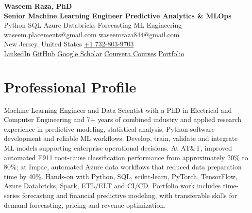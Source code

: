 \documentclass[9pt,letterpaper]{extarticle}
\begin{document}
\begin{center}
{\LARGE\bfseries Waseem Raza, PhD}{\normalsize\mdseries }\\[2pt]
{\large\bfseries Senior Machine Learning Engineer \textbar{} Predictive Analytics \& MLOps}\\[1pt]
{\small Python \textbar{} SQL \textbar{} Azure Databricks \textbar{} Forecasting \textbar{} ML Engineering}\\[3pt]
{\footnotesize {}\enspace \href{mailto:waseem.placements@gmail.com}{waseem.placements@gmail.com} \textbar{} \href{mailto:waseemraza844@gmail.com}{waseemraza844@gmail.com}\\[1pt]New Jersey, United States \quad {}\enspace \href{tel:+17328039703}{+1 732-803-9703}\\[1pt]\href{https://www.linkedin.com/in/waseem-raza-phd-9a737858/}{LinkedIn} \textbar{} \href{https://github.com/WaseemRaza844}{GitHub} \textbar{} \href{https://scholar.google.com/citations?user=d58Drr0AAAAJ\&hl=en}{Google Scholar} \textbar{} \href{https://waseemraza844.github.io/portfolio/learning.html}{Coursera Courses} \textbar{} \href{https://waseemraza844.github.io/portfolio/}{Portfolio}}
\end{center}
\vspace{-5pt}
\section{Professional Profile}
Machine Learning Engineer and Data Scientist with a PhD in Electrical and Computer Engineering and 7+ years of combined industry and applied research experience in predictive modeling, statistical analysis, Python software development and reliable ML workflows. Develop, train, validate and integrate ML models supporting enterprise operational decisions. At AT\&T, improved automated E911 root-cause classification performance from approximately 20\% to 80\%; at Impac, automated Azure data workflows that reduced data preparation time by 40\%. Hands-on with Python, SQL, scikit-learn, PyTorch, TensorFlow, Azure Databricks, Spark, ETL/ELT and CI/CD. Portfolio work includes time-series forecasting and financial predictive modeling, with transferable skills for demand forecasting, pricing and revenue optimization.
\end{document}

